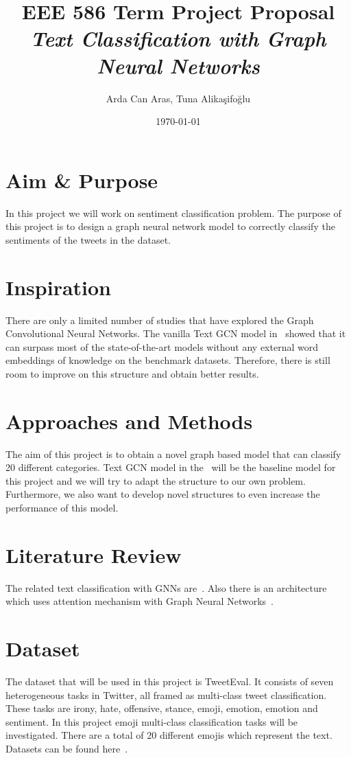\documentclass[a4paper, 12pt]{article}
\title{\textbf{EEE 586 Term Project Proposal}\\\Large \textit{Text Classification with Graph Neural Networks}}
\author{Arda Can Aras, Tuna Alikaşifoğlu}
\date{\today}
\begin{document}
\maketitle

\section{Aim \& Purpose}
In this project we will work on sentiment classification problem. The purpose of this project is to design a graph neural network model to correctly classify the sentiments of the tweets in the dataset.

\section{Inspiration}
There are only a limited number of studies that have explored the Graph Convolutional Neural Networks. The vanilla Text GCN model in~\autocite{yao2018graph} showed that it can surpass most of the state-of-the-art models without any external word embeddings of knowledge on the benchmark datasets. Therefore, there is still room to improve on this structure and obtain better results.

\section{Approaches and Methods}
The aim of this project is to obtain a novel graph based model that can classify 20 different categories. Text GCN model in the~\autocite{yao2018graph} will be the baseline model for this project and we will try to adapt the structure to our own problem. Furthermore, we also want to develop novel structures to even increase the performance of this model.

\section{Literature Review}
The related text classification with GNNs are~\autocite{yao2018graph,kipf2017semisupervised,peng2019hierarchical}. Also there is an architecture which uses attention mechanism with Graph Neural Networks~\autocite{velickovic2018graph}.

\section{Dataset}
The dataset that will be used in this project is TweetEval. It consists of seven heterogeneous tasks in Twitter, all framed as multi-class tweet classification. These tasks are irony, hate, offensive, stance, emoji, emotion, emotion and sentiment. In this project emoji multi-class classification tasks will be investigated. There are a total of 20 different emojis which represent the text. Datasets can be found here~\autocite{tweeteval}.
\end{document}

